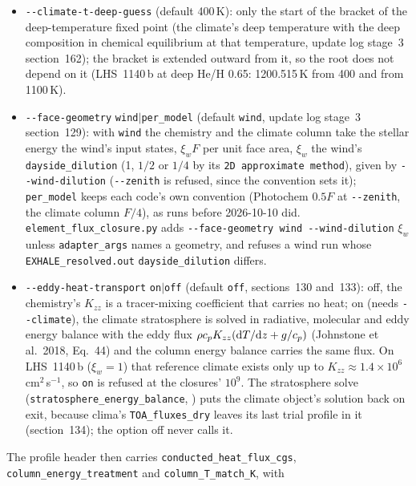 \documentclass[english,a4paper]{my_memo}
\begin{document}
\begin{itemize}
  (\texttt{recombination\_heat\_flux\_cgs} in the header).
\item \texttt{-{}-climate-t-deep-guess} (default 400\,K): only the start of
  the bracket of the deep-temperature fixed point (the climate's deep
  temperature with the deep composition in chemical equilibrium at that
  temperature, update log stage~3 section~162); the bracket is extended
  outward from it, so the root does not depend on it (LHS~1140\,b at deep
  He/H 0.65: 1200.515\,K from 400 and from 1100\,K).
\item \texttt{-{}-face-geometry} \texttt{wind}$|$\texttt{per\_model} (default
  \texttt{wind}, update log stage~3 section~129): with \texttt{wind} the
  chemistry and the climate column take the stellar energy the wind's input
  states, $\xi_wF$ per unit face area, $\xi_w$ the wind's
  \texttt{dayside\_dilution} (1, $1/2$ or $1/4$ by its \texttt{2D approximate
  method}), given by \texttt{-{}-wind-dilution} (\texttt{-{}-zenith} is
  refused, since the convention sets it);
  \texttt{per\_model} keeps each code's own convention (Photochem $0.5F$ at
  \texttt{-{}-zenith}, the climate column $F/4$), as runs before 2026-10-10
  did. \texttt{element\_flux\_closure.py} adds \texttt{-{}-face-geometry wind
  -{}-wind-dilution} $\xi_w$ unless \texttt{adapter\_args} names a geometry,
  and refuses a wind run whose \texttt{EXHALE\_resolved.out}
  \texttt{dayside\_dilution} differs.
\item \texttt{-{}-eddy-heat-transport} \texttt{on}$|$\texttt{off} (default
  \texttt{off}, sections~130 and~133): off, the chemistry's $K_{zz}$ is a
  tracer-mixing coefficient that carries no heat; on (needs
  \texttt{-{}-climate}), the climate stratosphere is solved in radiative,
  molecular and eddy energy balance with the eddy flux
  $\rho c_pK_{zz}({\rm d}T/{\rm d}z+g/c_p)$ (Johnstone et al.\ 2018, Eq.~44)
  and the column energy balance carries the same flux. On LHS~1140\,b
  ($\xi_w=1$) that reference climate exists only up to
  $K_{zz}\approx1.4\times10^{6}$\,cm$^2$\,s$^{-1}$, so \texttt{on} is
  refused at the closures' $10^{9}$. The stratosphere solve
  (\texttt{stratosphere\_energy\_balance},
  ) puts the climate object's solution
  back on exit, because clima's \texttt{TOA\_fluxes\_dry} leaves its last
  trial profile in it (section~134); the option off never calls it.
\end{itemize}
The profile header then carries \texttt{conducted\_heat\_flux\_cgs},
\texttt{column\_energy\_treatment} and \texttt{column\_T\_match\_K}, with
\end{document}
